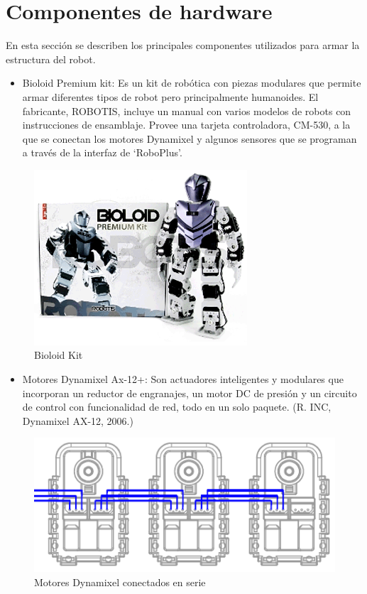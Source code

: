 \section{Componentes de hardware}
En esta sección se describen los principales componentes utilizados para armar la estructura del robot.
\begin{itemize}
\item Bioloid Premium kit: Es un kit de robótica con piezas modulares que permite armar diferentes tipos de robot pero principalmente humanoides. El fabricante, ROBOTIS, incluye un manual con varios modelos de robots con instrucciones de ensamblaje. Provee una tarjeta controladora, CM-530, a la que se conectan los motores Dynamixel y algunos sensores que se programan a través de la interfaz de ‘RoboPlus’.

\end{itemize}

\begin{figure}[hbtp]

\centering
\includegraphics[scale=0.5]{imagenes/product_bioloid17.png}
\caption{Bioloid Kit}
\end{figure}

\begin{itemize}

\item Motores Dynamixel Ax-12+: Son actuadores inteligentes y modulares que incorporan un reductor de engranajes, un motor DC de presión y un circuito de control con funcionalidad de red, todo en un solo paquete. (R. INC, Dynamixel AX-12, 2006.)
\end{itemize}

\begin{figure}[hbtp]

\centering
\includegraphics[scale=0.5]{imagenes/AX-12_serie.png}
\caption{Motores Dynamixel conectados en serie}
\end{figure}

